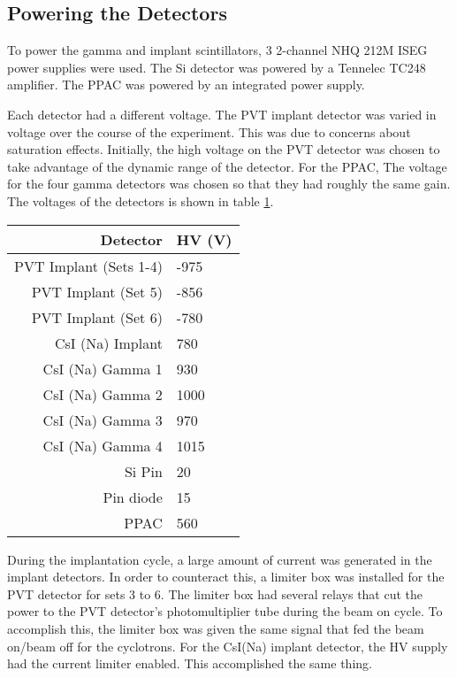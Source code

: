 \subsection{Powering the Detectors}

To power the gamma and implant scintillators, 3 2-channel NHQ 212M ISEG power supplies were used.
The Si detector was powered by a Tennelec TC248 amplifier.
The PPAC was powered by an integrated power supply.

Each detector had a different voltage. 
The PVT implant detector was varied in voltage over the course of the experiment.
This was due to concerns about saturation effects.
Initially, the high voltage on the PVT detector was chosen to take advantage of the dynamic range of the detector.
For the PPAC, 
The voltage for the four gamma detectors was chosen so that they had roughly the same gain.
The voltages of the detectors is shown in table \ref{tab:detvolt}.
\begin{table}[!hbt]
	\centering
		\begin{tabular}{r|l}
		Detector & HV (V) \\ \hline
		PVT Implant (Sets 1-4) & -975 \\
		PVT Implant (Set 5) & -856 \\
		PVT Implant (Set 6) & -780 \\
		CsI (Na) Implant & 780 \\ 
		CsI (Na) Gamma 1 & 930 \\
		CsI (Na) Gamma 2 & 1000 \\
		CsI (Na) Gamma 3 & 970 \\
		CsI (Na) Gamma 4 & 1015 \\
		Si Pin & 20 \\
		Pin diode & 15 \\
		PPAC & 560 
		\label{tab:detvolt}
		\end{tabular}
\end{table}

During the implantation cycle, a large amount of current was generated in the implant detectors.
In order to counteract this, a limiter box was installed for the PVT detector for sets 3 to 6.
The limiter box had several relays that cut the power to the PVT detector's photomultiplier tube during the beam on cycle. 
To accomplish this, the limiter box was given the same signal that fed the beam on/beam off for the cyclotrons.
For the CsI(Na) implant detector, the HV supply had the current limiter enabled.
This accomplished the same thing.



